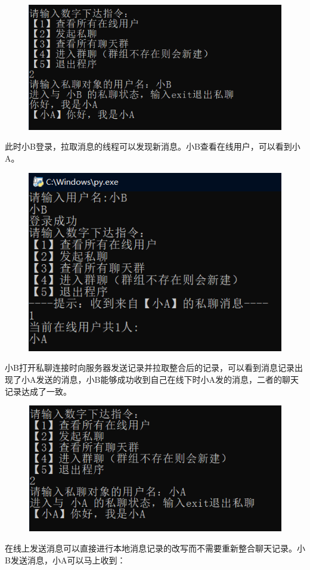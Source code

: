 \documentclass{report}
\begin{document}
\begin{figure}[h]\centering
\includegraphics[scale=0.3]{pic/2.png}
\end{figure}
此时小B登录，拉取消息的线程可以发现新消息。小B查看在线用户，可以看到小A。

\begin{figure}[h]\centering
\includegraphics[scale=0.3]{pic/3.png}
\end{figure}
小B打开私聊连接时向服务器发送记录并拉取整合后的记录，可以看到消息记录出现了小A发送的消息，小B能够成功收到自己在线下时小A发的消息，二者的聊天记录达成了一致。

\begin{figure}[h]\centering
\includegraphics[scale=0.3]{pic/4.png}
\end{figure}
在线上发送消息可以直接进行本地消息记录的改写而不需要重新整合聊天记录。小B发送消息，小A可以马上收到：
\end{document}
